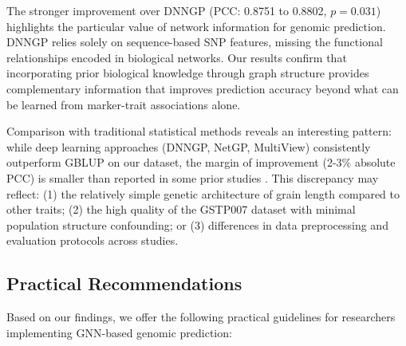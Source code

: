 \documentclass[11pt,a4paper]{article}
\begin{document}
The stronger improvement over DNNGP (PCC: 0.8751 to 0.8802, $p=0.031$) highlights the particular value of network information for genomic prediction. DNNGP relies solely on sequence-based SNP features, missing the functional relationships encoded in biological networks. Our results confirm that incorporating prior biological knowledge through graph structure provides complementary information that improves prediction accuracy beyond what can be learned from marker-trait associations alone.

Comparison with traditional statistical methods reveals an interesting pattern: while deep learning approaches (DNNGP, NetGP, MultiView) consistently outperform GBLUP on our dataset, the margin of improvement (2-3\% absolute PCC) is smaller than reported in some prior studies \citep{ma2021cropformer}. This discrepancy may reflect: (1) the relatively simple genetic architecture of grain length compared to other traits; (2) the high quality of the GSTP007 dataset with minimal population structure confounding; or (3) differences in data preprocessing and evaluation protocols across studies.

\subsection{Practical Recommendations}
\label{subsec:recommendations}

Based on our findings, we offer the following practical guidelines for researchers implementing GNN-based genomic prediction:
\end{document}
